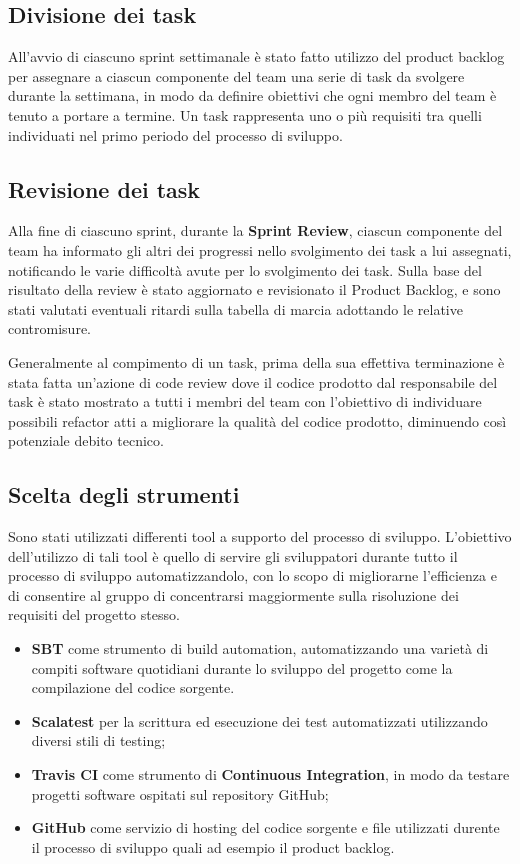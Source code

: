 \subsection{Divisione dei task}
All'avvio di ciascuno sprint settimanale è stato fatto utilizzo del product backlog per assegnare a ciascun componente del team una serie di task da svolgere durante la settimana, in modo da definire obiettivi che ogni membro del team è tenuto a portare a termine. Un task rappresenta uno o più requisiti tra quelli individuati nel primo periodo del processo di sviluppo.

\subsection{Revisione dei task}
Alla fine di ciascuno sprint, durante la \textbf{Sprint Review}, ciascun componente del team ha informato gli altri dei progressi nello svolgimento dei task a lui assegnati, notificando le varie difficoltà avute per lo svolgimento dei task. Sulla base del risultato della review è stato aggiornato e revisionato il Product Backlog, e sono stati valutati eventuali ritardi sulla tabella di marcia adottando le relative contromisure.

Generalmente al compimento di un task, prima della sua effettiva terminazione è stata fatta un'azione di code review dove il codice prodotto dal responsabile del task è stato mostrato a tutti i membri del team con l'obiettivo di individuare possibili refactor atti a migliorare la qualità del codice prodotto, diminuendo così potenziale debito tecnico.

\subsection{Scelta degli strumenti}
Sono stati utilizzati differenti tool a supporto del processo di sviluppo. L'obiettivo dell'utilizzo di tali tool è quello di servire gli sviluppatori durante tutto il processo di sviluppo automatizzandolo, con lo scopo di migliorarne l'efficienza e di consentire al gruppo di concentrarsi maggiormente sulla risoluzione dei requisiti del progetto stesso.

\begin{itemize}
    \item \textbf{SBT} come strumento di build automation, automatizzando una varietà di compiti software quotidiani durante lo sviluppo del progetto come la compilazione del codice sorgente.
    \item \textbf{Scalatest} per la scrittura ed esecuzione dei test automatizzati utilizzando diversi stili di testing;
    \item \textbf{Travis CI} come strumento di \textbf{Continuous Integration}, in modo da testare progetti software ospitati sul repository GitHub;
    \item \textbf{GitHub} come servizio di hosting del codice sorgente e file utilizzati durente il processo di sviluppo quali ad esempio il product backlog. 
\end{itemize}